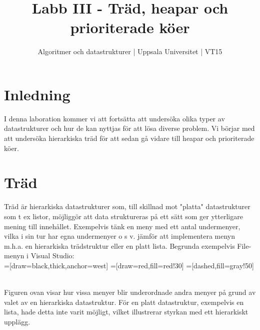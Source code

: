 \documentclass{article}
\begin{document}
  \title{Labb III - Träd, heapar och prioriterade köer }
  \author{ Algoritmer och datastrukturer | Uppsala Universitet | VT15 }
  \date{}
  \maketitle


  \section*{Inledning}
 I denna laboration kommer vi att fortsätta att undersöka olika typer av datastrukturer och
 hur de kan nyttjas för att lösa diverse problem. Vi börjar med att undersöka hierarkiska träd
 för att sedan gå vidare till heapar och prioriterade köer.



  \section*{Träd
  }

  Träd är hierarkiska datastrukturer som, till skillnad mot "platta" datastrukturer som t ex
  listor, möjliggör att data struktureras på ett sätt som ger ytterligare mening till innehållet.
  Exempelvis tänk en meny med ett antal undermenyer, vilka i sin tur har egna undermenyer
  o s v. jämför att implementera menyn m.h.a. en hierarkiska trädstruktur eller en platt lista.
  Begrunda exempelvis File-menyn i Visual Studio:\\
  
  =[draw=black,thick,anchor=west]
  =[draw=red,fill=red!30]
  =[dashed,fill=gray!50]
\\Figuren ovan visar hur vissa menyer blir underordnade andra menyer på grund av valet
av en hierarkiska datastruktur. För en platt datastruktur, exempelvis en lista, hade detta
inte varit möjligt, vilket illustrerar styrkan med ett hierarkiskt upplägg.\\
\end{document}
